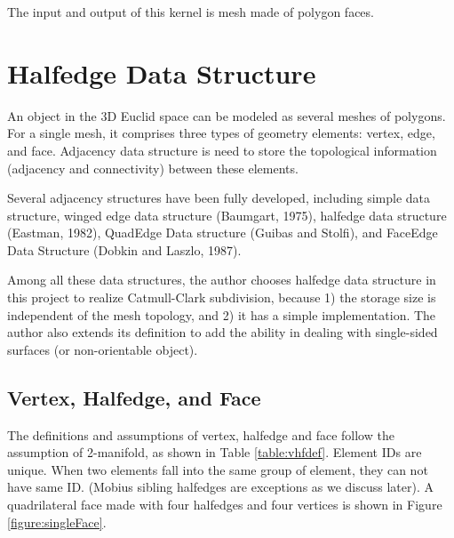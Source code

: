 \documentclass[12pt]{article}
\begin{document}
The input and output of this kernel is mesh made of polygon faces. 

\newpage
\section{Halfedge Data Structure} \label{sec:halfedge}

An object in the 3D Euclid space can be modeled as several meshes of polygons. For a single mesh, it comprises three types of geometry elements: vertex, edge, and face. Adjacency data structure is need to store the topological information (adjacency and connectivity) between these elements.

Several adjacency structures have been fully developed, including simple data structure, winged edge data structure (Baumgart, 1975), halfedge data structure (Eastman, 1982), QuadEdge Data structure (Guibas and Stolfi), and FaceEdge Data Structure (Dobkin and Laszlo, 1987).

Among all these data structures, the author chooses halfedge data structure in this project to realize Catmull-Clark subdivision, because 1) the storage size is independent of the mesh topology, and 2) it has a simple implementation. The author also extends its definition to add the ability in dealing with single-sided surfaces (or non-orientable object).

\subsection{Vertex, Halfedge, and Face}

The definitions and assumptions of vertex, halfedge and face follow the assumption of 2-manifold, as shown in Table \ref{table:vhfdef}. Element IDs are unique. When two elements fall into the same group of element, they can not have same ID. (Mobius sibling halfedges are exceptions as we discuss later). A quadrilateral face made with four halfedges and four vertices is shown in Figure \ref{figure:singleFace}.
\end{document}
